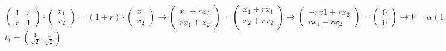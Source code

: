 \begin{enumerate}[label=\color{red}\textbf{\arabic*)}, leftmargin=*]
\begin{enumerate}[label=\color{lightblue}\textbf{\alph*)}]
\begin{enumerate}[label=\color{lightblue}\arabic*)]
	$\begin{pmatrix}
		1 & r\\
		r & 1
	\end{pmatrix}\cdot\begin{pmatrix}
	x_1\\
	x_2
	\end{pmatrix}=(1+r)\cdot\begin{pmatrix}
	x_1\\
	x_2
	\end{pmatrix}\longrightarrow\begin{pmatrix}
	x_1+rx_2\\
	rx_1+x_2
	\end{pmatrix}=\begin{pmatrix}
	x_1+rx_1\\
	x_2+rx_2\\
	\end{pmatrix}\longrightarrow\begin{pmatrix}
	-rx1+rx_2\\
	rx_1-rx_2
	\end{pmatrix}=\begin{pmatrix}
	0\\
	0
	\end{pmatrix}\longrightarrow V=\alpha(1,1)' $\\
	
	$t_1=\left(\frac{1}{\sqrt{2}},\frac{1}{\sqrt{2}}\right)$
	

\end{enumerate}
\end{enumerate}
\end{enumerate}
